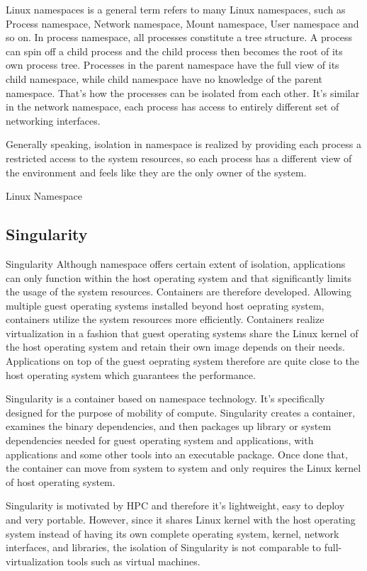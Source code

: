 \documentclass{article}
\begin{document}
Linux namespaces is a general term refers to many Linux namespaces, such as Process namespace, Network namespace, Mount namespace, User namespace and so on. In process namespace, all processes constitute a tree structure. A process can spin off a child process and the child process then becomes the root of its own process tree. Processes in the parent namespace have the full view of its child namespace, while child namespace have no knowledge of the parent namespace. That's how the processes can be isolated from each other. It's similar in the network namespace, each process has access to entirely different set of networking interfaces. 

Generally speaking, isolation in namespace is realized by providing each process a restricted access to the system resources, so each process has a different view of the environment and feels like they are the only owner of the system. 

Linux Namespace\cite{rosen2013resource}

\subsection{Singularity}

Singularity\cite{singularity} Although namespace offers certain extent of isolation, applications can only function within the host operating system and that significantly limits the usage of the system resources. Containers are therefore developed. Allowing multiple guest operating systems installed beyond host oeprating system, containers utilize the system resources more efficiently. Containers realize virtualization in a fashion that guest operating systems share the Linux kernel of the host operating system and retain their own image depends on their needs. Applications on top of the guest oeprating system therefore are quite close to the host operating system which guarantees the performance. 

Singularity is a container based on namespace technology. It's specifically designed for the purpose of mobility of compute. Singularity creates a container, examines the binary dependencies, and then packages up library or system dependencies needed for guest operating system and applications, with applications and some other tools into an executable package. Once done that, the container can move from system to system and only requires the Linux kernel of host operating system.

Singularity is motivated by HPC and therefore it's lightweight, easy to deploy and very portable. However, since it shares Linux kernel with the host operating system instead of having its own complete operating system, kernel, network interfaces, and libraries, the isolation of Singularity is not comparable to full-virtualization tools such as virtual machines.
\end{document}
